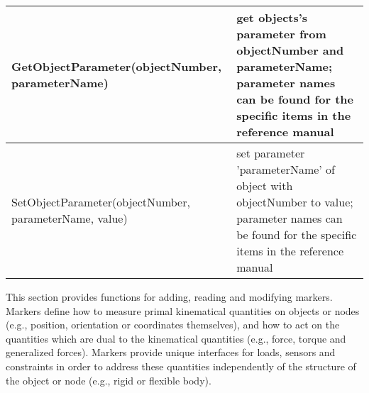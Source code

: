 \begin{center}
\begin{longtable}{| p{8cm} | p{8cm} |}
  GetObjectParameter(objectNumber, parameterName) & get objects's parameter from objectNumber and parameterName; parameter names can be found for the specific items in the reference manual\\ \hline 
  SetObjectParameter(objectNumber, parameterName, value) & set parameter 'parameterName' of object with objectNumber to value; parameter names can be found for the specific items in the reference manual\\ \hline 
\end{longtable}
\end{center}

This section provides functions for adding, reading and modifying markers. Markers define how to measure primal kinematical quantities on objects or nodes (e.g., position, orientation or coordinates themselves), and how to act on the quantities which are dual to the kinematical quantities (e.g., force, torque and generalized forces). Markers provide unique interfaces for loads, sensors and constraints in order to address these quantities independently of the structure of the object or node (e.g., rigid or flexible body).

